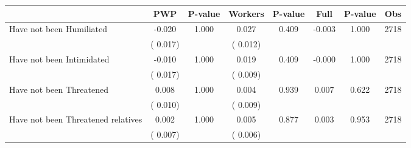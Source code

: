 
\begin{tabular}{l*{7}{c}}\hline&\multicolumn{1}{c}{PWP}&\multicolumn{1}{c}{P-value}&\multicolumn{1}{c}{Workers}&\multicolumn{1}{c}{P-value}&\multicolumn{1}{c}{Full}&\multicolumn{1}{c}{P-value}&\multicolumn{1}{c}{Obs} \\ \hline

 Have not been Humiliated       &             -0.020       &        1.000  &              0.027       &        0.409  &             -0.003       &              1.000 &  2718 \\ 
                       &       (       0.017)             &                               &       (       0.012)                     &                               &                                               &                                &                      \\ 

 Have not been Intimidated       &             -0.010       &        1.000  &              0.019       &        0.409  &             -0.000       &              1.000 &  2718 \\ 
                       &       (       0.017)             &                               &       (       0.009)                     &                               &                                               &                                &                      \\ 

 Have not been Threatened       &              0.008       &        1.000  &              0.004       &        0.939  &              0.007       &              0.622 &  2718 \\ 
                       &       (       0.010)             &                               &       (       0.009)                     &                               &                                               &                                &                      \\ 

 Have not been Threatened relatives       &              0.002       &        1.000  &              0.005       &        0.877  &              0.003       &              0.953 &  2718 \\ 
                       &       (       0.007)             &                               &       (       0.006)                     &                               &                                               &                                &                      \\ 


\end{tabular}
